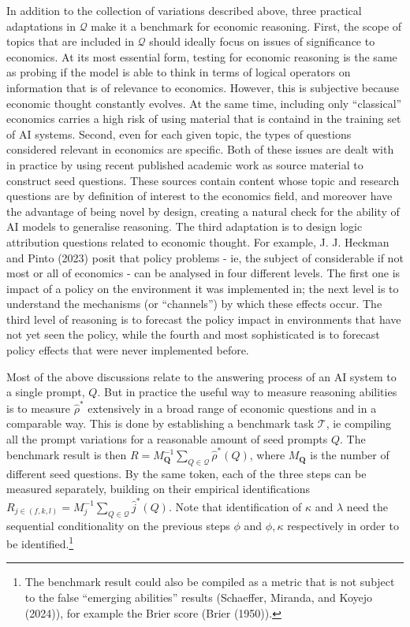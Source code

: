 \documentclass[
]{article}
\begin{document}
In addition to the collection of variations described above, three
practical adaptations in \(\mathcal{Q}\) make it a benchmark for
economic reasoning. First, the scope of topics that are included in
\(\mathcal{Q}\) should ideally focus on issues of significance to
economics. At its most essential form, testing for economic reasoning is
the same as probing if the model is able to think in terms of logical
operators on information that is of relevance to economics. However,
this is subjective because economic thought constantly evolves. At the
same time, including only ``classical'' economics carries a high risk of
using material that is containd in the training set of AI systems.
Second, even for each given topic, the types of questions considered
relevant in economics are specific. Both of these issues are dealt with
in practice by using recent published academic work as source material
to construct seed questions. These sources contain content whose topic
and research questions are by definition of interest to the economics
field, and moreover have the advantage of being novel by design,
creating a natural check for the ability of AI models to generalise
reasoning. The third adaptation is to design logic attribution questions
related to economic thought. For example, J. J. Heckman and Pinto (2023)
posit that policy problems - ie, the subject of considerable if not most
or all of economics - can be analysed in four different levels. The
first one is impact of a policy on the environment it was implemented
in; the next level is to understand the mechanisms (or ``channels'') by
which these effects occur. The third level of reasoning is to forecast
the policy impact in environments that have not yet seen the policy,
while the fourth and most sophisticated is to forecast policy effects
that were never implemented before.

Most of the above discussions relate to the answering process of an AI
system to a single prompt, \(Q\). But in practice the useful way to
measure reasoning abilities is to measure \(\hat{\rho}^*\) extensively
in a broad range of economic questions and in a comparable way. This is
done by establishing a benchmark task \(\mathcal{T}\), ie compiling all
the prompt variations for a reasonable amount of seed prompts \(Q\). The
benchmark result is then
\(R = M_{\mathbf{Q}}^{-1}\sum_{Q \in \mathcal{Q}} \hat{\rho}^*(Q)\),
where \(M_{\mathbf{Q}}\) is the number of different seed questions. By
the same token, each of the three steps can be measured separately,
building on their empirical identifications
\(R_{j \in (f, k, l)} = M_{j}^{-1}\sum_{Q \in \mathcal{Q}} \hat{j}^*(Q)\).
Note that identification of \(\kappa\) and \(\lambda\) need the
sequential conditionality on the previous steps \(\phi\) and
\(\phi, \kappa\) respectively in order to be identified.\footnote{The
  benchmark result could also be compiled as a metric that is not
  subject to the false ``emerging abilities'' results (Schaeffer,
  Miranda, and Koyejo (2024)), for example the Brier score (Brier
  (1950)).}
\end{document}

